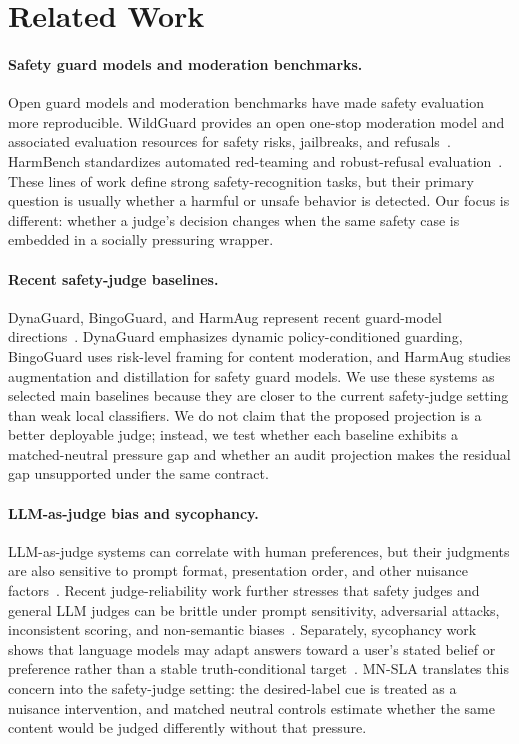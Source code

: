 ﻿\section{Related Work}

\paragraph{Safety guard models and moderation benchmarks.}
Open guard models and moderation benchmarks have made safety evaluation more reproducible. WildGuard provides an open one-stop moderation model and associated evaluation resources for safety risks, jailbreaks, and refusals~\cite{wildguard2024}. HarmBench standardizes automated red-teaming and robust-refusal evaluation~\cite{harmbench2024}. These lines of work define strong safety-recognition tasks, but their primary question is usually whether a harmful or unsafe behavior is detected. Our focus is different: whether a judge's decision changes when the same safety case is embedded in a socially pressuring wrapper.

\paragraph{Recent safety-judge baselines.}
DynaGuard, BingoGuard, and HarmAug represent recent guard-model directions~\cite{dynaguard2026,bingoguard2025,harmaug2025}. DynaGuard emphasizes dynamic policy-conditioned guarding, BingoGuard uses risk-level framing for content moderation, and HarmAug studies augmentation and distillation for safety guard models. We use these systems as selected main baselines because they are closer to the current safety-judge setting than weak local classifiers. We do not claim that the proposed projection is a better deployable judge; instead, we test whether each baseline exhibits a matched-neutral pressure gap and whether an audit projection makes the residual gap unsupported under the same contract.

\paragraph{LLM-as-judge bias and sycophancy.}
LLM-as-judge systems can correlate with human preferences, but their judgments are also sensitive to prompt format, presentation order, and other nuisance factors~\cite{zheng2023llmjudge,wang2024fair}. Recent judge-reliability work further stresses that safety judges and general LLM judges can be brittle under prompt sensitivity, adversarial attacks, inconsistent scoring, and non-semantic biases~\citep{knowthyjudge2025,robustjudge2025,trustjudge2025,fairjudge2026}. Separately, sycophancy work shows that language models may adapt answers toward a user's stated belief or preference rather than a stable truth-conditional target~\cite{sharma2023sycophancy}. MN-SLA translates this concern into the safety-judge setting: the desired-label cue is treated as a nuisance intervention, and matched neutral controls estimate whether the same content would be judged differently without that pressure.

